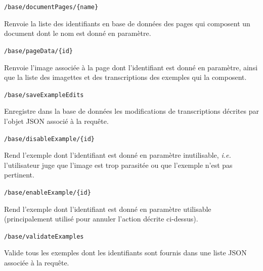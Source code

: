 \begin{description}[align=left]
\item [GET] \texttt{/base/documentPages/\{name\}}\newline{}
\begin{itshape}
Renvoie la liste des identifiants en base de données des pages qui composent un document dont le nom est donné en paramètre.
\end{itshape}

\item [GET] \texttt{/base/pageData/\{id\}}\newline{}
\begin{itshape}
Renvoie l'image associée à la page dont l'identifiant est donné en paramètre, ainsi que la liste des imagettes et des transcriptions des exemples qui la composent.
\end{itshape}

\item [POST] \texttt{/base/saveExampleEdits}\newline{}
\begin{itshape}
Enregistre dans la base de données les modifications de transcriptions décrites par l'objet JSON associé à la requête.
\end{itshape}

\item [PUT] \texttt{/base/disableExample/\{id\}}\newline{}
\begin{itshape}
Rend l'exemple dont l'identifiant est donné en paramètre inutilisable, \textit{i.e.} l'utilisateur juge que l'image est trop parasitée ou que l'exemple n'est pas pertinent.
\end{itshape}

\item [PUT] \texttt{/base/enableExample/\{id\}}\newline{}
\begin{itshape}
Rend l'exemple dont l'identifiant est donné en paramètre utilisable (principalement utilisé pour annuler l'action décrite ci-dessus).
\end{itshape}

\item [POST] \texttt{/base/validateExamples}\newline{}
\begin{itshape}
Valide tous les exemples dont les identifiants sont fournis dans une liste JSON associée à la requête.
\end{itshape}

\newline{}
\item [Découpe]


\end{description}
